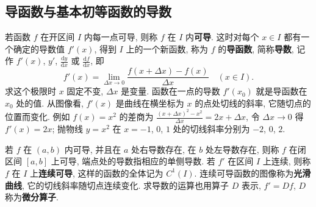 \documentclass[UTF8,openany]{ctexbook}
\theoremstyle{chinesetextbook}
\newcommand{\dd}{\mathrm d}
\begin{document}
\subsection{导函数与基本初等函数的导数}
若函数 $f$ 在开区间 $I$ 内每一点可导, 则称 $f$ 在 $I$ 内\textbf{可导}. 这时对每个 $x\in I$ 都有一个确定的导数值 $f'(x)$, 得到 $I$ 上的一个新函数, 称为 $f$ 的\textbf{导函数}, 简称\textbf{导数}, 记作 $f'(x)$, $y'$, $\displaystyle\frac{\dd y}{\dd x}$ 或 $\displaystyle\frac{\dd f}{\dd x}$, 即
\[
f'(x)=\lim_{\Delta x\to0}\frac{f(x+\Delta x)-f(x)}{\Delta x}\quad(x\in I).
\]
求这个极限时 $x$ 固定不变, $\Delta x$ 是变量. 函数在一点的导数 $f'(x_0)$ 就是导函数在 $x_0$ 处的值. 从图像看, $f'(x)$ 是曲线在横坐标为 $x$ 的点处切线的斜率, 它随切点的位置而变化. 例如 $f(x)=x^2$ 的差商为 $\displaystyle\frac{(x+\Delta x)^2-x^2}{\Delta x}=2x+\Delta x$, 令 $\Delta x\to0$ 得 $f'(x)=2x$; 抛物线 $y=x^2$ 在 $x=-1$, $0$, $1$ 处的切线斜率分别为 $-2$, $0$, $2$.

若 $f$ 在 $(a,b)$ 内可导, 并且在 $a$ 处右导数存在, 在 $b$ 处左导数存在, 则称 $f$ 在闭区间 $[a,b]$ 上可导, 端点处的导数指相应的单侧导数. 若 $f'$ 在区间 $I$ 上连续, 则称 $f$ 在 $I$ 上\textbf{连续可导}, 这样的函数的全体记为 $C^1(I)$. 连续可导函数的图像称为\textbf{光滑曲线}, 它的切线斜率随切点连续变化. 求导数的运算也用算子 $D$ 表示, $f'=Df$, $D$ 称为\textbf{微分算子}.
\end{document}
